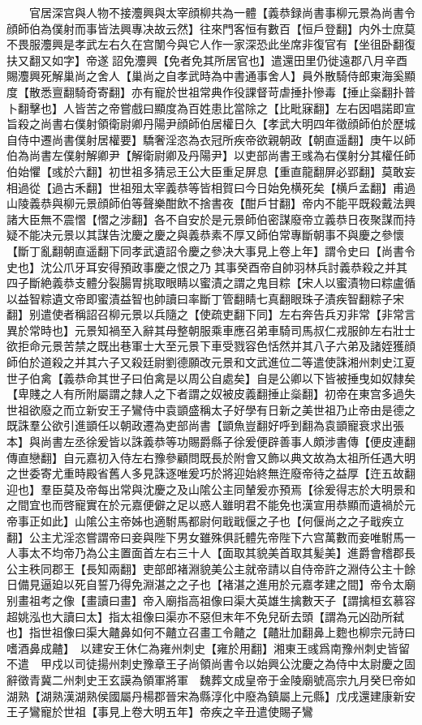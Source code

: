 　　官居深宫與人物不接灋興與太宰顔柳共為一體【義恭録尚書事柳元景為尚書令顔師伯為僕射而事皆法興專决故云然】往來門客恒有數百【恒戶登翻】内外士庶莫不畏服灋興是孝武左右久在宫闈今與它人作一家深恐此坐席非復官有【坐徂卧翻復扶又翻又如字】帝遂詔免灋興【免者免其所居官也】遣還田里仍徙遠郡八月辛酉賜灋興死解巢尚之舍人【巢尚之自孝武時為中書通事舍人】員外散騎侍郎東海奚顯度【散悉亶翻騎奇寄翻】亦有寵於世祖常典作役課督苛虐捶扑慘毒【捶止橤翻扑普卜翻擊也】人皆苦之帝嘗戲曰顯度為百姓患比當除之【比毗寐翻】左右因唱諾即宣旨殺之尚書右僕射領衛尉卿丹陽尹顔師伯居權日久【孝武大明四年徵顔師伯於歷城自侍中遷尚書僕射居權要】驕奢淫恣為衣冠所疾帝欲親朝政【朝直遥翻】庚午以師伯為尚書左僕射解卿尹【解衛尉卿及丹陽尹】以吏部尚書王彧為右僕射分其權任師伯始懼【彧於六翻】初世祖多猜忌王公大臣重足屏息【重直龍翻屏必郢翻】莫敢妄相過從【過古禾翻】世祖殂太宰義恭等皆相賀曰今日始免横死矣【横戶孟翻】甫過山陵義恭與柳元景顔師伯等聲樂酣飲不捨書夜【酣戶甘翻】帝内不能平既殺戴法興諸大臣無不震慴【慴之涉翻】各不自安於是元景師伯密謀廢帝立義恭日夜聚謀而持疑不能决元景以其謀告沈慶之慶之與義恭素不厚又師伯常專斷朝事不與慶之參懷【斷丁亂翻朝直遥翻下同孝武遺詔令慶之參决大事見上卷上年】謂令史曰【尚書令史也】沈公爪牙耳安得預政事慶之恨之乃其事癸酉帝自帥羽林兵討義恭殺之并其四子斷絶義恭支體分裂腸胃挑取眼睛以蜜漬之謂之鬼目粽【宋人以蜜漬物曰粽盧循以益智粽遺文帝即蜜漬益智也帥讀曰率斷丁管翻睛七真翻眼珠子漬疾智翻粽子宋翻】别遣使者稱詔召柳元景以兵隨之【使疏吏翻下同】左右奔告兵刃非常【非常言異於常時也】元景知禍至入辭其母整朝服乘車應召弟車騎司馬叔仁戎服帥左右壯士欲拒命元景苦禁之既出巷軍士大至元景下車受戮容色恬然并其八子六弟及諸姪獲顔師伯於道殺之并其六子又殺廷尉劉德願改元景和文武進位二等遣使誅湘州刺史江夏世子伯禽【義恭命其世子曰伯禽是以周公自處矣】自是公卿以下皆被捶曳如奴隸矣【卑賤之人有所附屬謂之隸人之下者謂之奴被皮義翻捶止橤翻】初帝在東宫多過失世祖欲廢之而立新安王子鸞侍中袁顗盛稱太子好學有日新之美世祖乃止帝由是德之既誅羣公欲引進顗任以朝政遷為吏部尚書【顗魚豈翻好呼到翻為袁顗寵衰求出張本】與尚書左丞徐爰皆以誅義恭等功賜爵縣子徐爰便辟善事人頗涉書傳【便皮連翻傳直戀翻】自元嘉初入侍左右豫參顧問既長於附會又飾以典文故為太祖所任遇大明之世委寄尤重時殿省舊人多見誅逐唯爰巧於將迎始終無迕廢帝待之益厚【迕五故翻迎也】羣臣莫及帝每出常與沈慶之及山隂公主同輦爰亦預焉【徐爰得志於大明景和之間宜也而啓寵實在於元嘉便僻之足以惑人雖明君不能免也漢宣用恭顯而遺禍於元帝事正如此】山隂公主帝姊也適駙馬都尉何戢戢偃之子也【何偃尚之之子戢疾立翻】公主尤淫恣嘗謂帝曰妾與陛下男女雖殊俱託體先帝陛下六宫萬數而妾唯駙馬一人事太不均帝乃為公主置面首左右三十人【面取其貌美首取其髪美】進爵會稽郡長公主秩同郡王【長知兩翻】吏部郎褚淵貌美公主就帝請以自侍帝許之淵侍公主十餘日備見逼廹以死自誓乃得免淵湛之之子也【褚湛之進用於元嘉孝建之間】帝令太廟别畫祖考之像【畫讀曰畫】帝入廟指高祖像曰渠大英雄生擒數天子【謂擒桓玄慕容超姚泓也大讀曰太】指太祖像曰渠亦不惡但末年不免兒斫去頭【謂為元凶劭所弑也】指世祖像曰渠大齄鼻如何不齄立召畫工令齄之【齄壯加翻鼻上麭也柳宗元詩曰嗜酒鼻成齄】　以建安王休仁為雍州刺史【雍於用翻】湘東王彧爲南豫州刺史皆留不遣　甲戍以司徒揚州刺史豫章王子尚領尚書令以始興公沈慶之為侍中太尉慶之固辭徵青冀二州刺史王玄謨為領軍將軍　魏葬文成皇帝于金陵廟號高宗九月癸巳帝如湖熟【湖熟漢湖熟侯國屬丹楊郡晉宋為縣淳化中廢為鎮屬上元縣】戊戌還建康新安王子鸞寵於世祖【事見上卷大明五年】帝疾之辛丑遣使賜子鸞